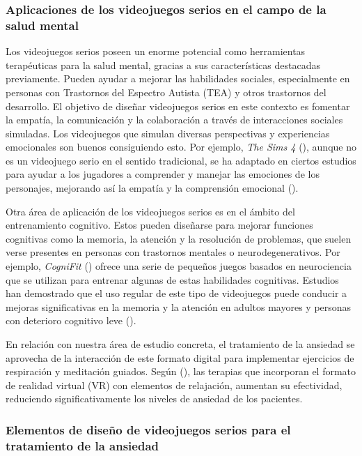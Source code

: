 \subsubsection{Aplicaciones de los videojuegos serios en el campo de la salud mental}

Los videojuegos serios poseen un enorme potencial como herramientas terapéuticas para la salud mental, gracias a sus características destacadas previamente. Pueden ayudar a mejorar las habilidades sociales, especialmente en personas con Trastornos del Espectro Autista (TEA) y otros trastornos del desarrollo. El objetivo de diseñar videojuegos serios en este contexto es fomentar la empatía, la comunicación y la colaboración a través de interacciones sociales simuladas. Los videojuegos que simulan diversas perspectivas y experiencias emocionales son buenos consiguiendo esto. Por ejemplo, \textit{The Sims 4} (\cite{SIMS4:2014}), aunque no es un videojuego serio en el sentido tradicional, se ha adaptado en ciertos estudios para ayudar a los jugadores a comprender y manejar las emociones de los personajes, mejorando así la empatía y la comprensión emocional (\cite{FERGUSON:2013}).

Otra área de aplicación de los videojuegos serios es en el ámbito del entrenamiento cognitivo. Estos pueden diseñarse para mejorar funciones cognitivas como la memoria, la atención y la resolución de problemas, que suelen verse presentes en personas con trastornos mentales o neurodegenerativos. Por ejemplo, \textit{CogniFit} (\cite{COGNIFIT:1999}) ofrece una serie de pequeños juegos basados en neurociencia que se utilizan para entrenar algunas de estas habilidades cognitivas. Estudios han demostrado que el uso regular de este tipo de  videojuegos puede conducir a mejoras significativas en la memoria y la atención en adultos mayores y personas con deterioro cognitivo leve (\cite{LAMPIT:2014}).

En relación con nuestra área de estudio concreta, el tratamiento de la ansiedad se aprovecha de la interacción de este formato digital para implementar ejercicios de respiración y meditación guiados. Según \citeauthor{BOUCHARD:2017} (\citeyear{BOUCHARD:2017}), las terapias que incorporan el formato de realidad virtual (VR) con elementos de relajación, aumentan su efectividad, reduciendo significativamente los niveles de ansiedad de los pacientes.

\subsubsection{Elementos de diseño de videojuegos serios para el tratamiento de la ansiedad}


